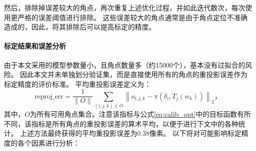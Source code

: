 然后，排除掉误差较大的角点，再次重复上述优化过程，并如此迭代数次，每次使用更严格的误差阈值进行排除。
这些误差较大的角点通常是由于角点定位不准确造成的，因此，将其排除后可以提高标定的精度。

\paragraph{标定结果和误差分析}

由于本文采用的模型参数量小，且角点数量多（约15000个），基本没有过拟合的风险。
因此本文并未单独划分验证集，而是直接使用所有的角点的重投影误差作为标定精度的评价标准。
平均重投影误差定义为：
\begin{equation}
    \label{eq:reproj_err}
    \text{reproj\_err} = \frac{1}{\|O\|}\sum_{(i,j,k)\in O}\left\|o_{i,j,k} - \pi\left(\delta_i, T_j(w_k)\right)\right\|_2
    \text{，}
\end{equation}
其中，$O$为所有可用角点集合。注意该指标与公式\eqref{eq:calib_opt}中的目标函数有所不同，该指标是所有角点的重投影误差的算术平均，以便于进行下文中的各种统计。
上述方法最终获得的平均重投影误差为0.38像素。
以下将对可能影响标定精度的各个因素进行分析：

